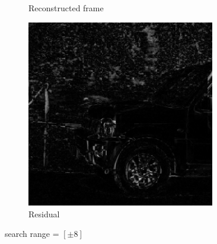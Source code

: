\documentclass{homework}
\begin{document}
\begin{figure}[H]
\begin{subfigure}{0.32\textwidth}
        \caption{Reconstructed frame}
    \end{subfigure}
    \begin{subfigure}{0.32\textwidth}
        \centering
        \includegraphics[width=0.9\textwidth]{8_8_residual.png}
        \caption{Residual}
    \end{subfigure}
    \caption{search range = $[\pm 8]$}
\end{figure}
\end{document}
